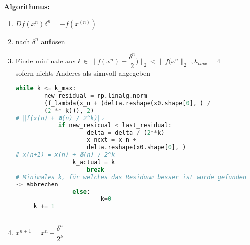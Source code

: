 \documentclass[../ZF_HM2.tex]{subfiles}
\begin{document}
\pagebreak

\begin{mdframed}
	\textbf{Algorithmus:\\}
	\begin{enumerate}
		\item $Df(x^{n})\delta ^{n} = -f(x^{(n)})$
		\item nach $\delta ^{n}$ auflösen
		\item Finde minimale aus $k \in \|f(x^{n}) + \dfrac{\delta ^{n}} {2})\|_2 < \|f(x^{n} \|_2$ $,k_{max} = 4$\\
		sofern nichts Anderes als sinnvoll angegeben\\
 \UseRawInputEncoding
\begin{lstlisting}[language=Python]
	while k <= k_max:
		new_residual = np.linalg.norm
		(f_lambda(x_n + (delta.reshape(x0.shape[0], ) / 
		(2 ** k))), 2) 
# ‖f(x(n) + 𝛅(n) / 2^k)‖₂
	        if new_residual < last_residual:
	        		delta = delta / (2**k)
	        		x_next = x_n + 
	        		delta.reshape(x0.shape[0], )  
# x(n+1) = x(n) + 𝛅(n) / 2^k
				k_actual = k
	                break  
# Minimales k, für welches das Residuum besser ist wurde gefunden 
-> abbrechen
	            else:
	            		k=0
	 k += 1
            		

\end{lstlisting}
		
		\item $x^{n+1} = x^{n} +\dfrac{\delta ^{n}}{2^{k}} $\\

	\end{enumerate}
\end{mdframed}







 
\end{document}
